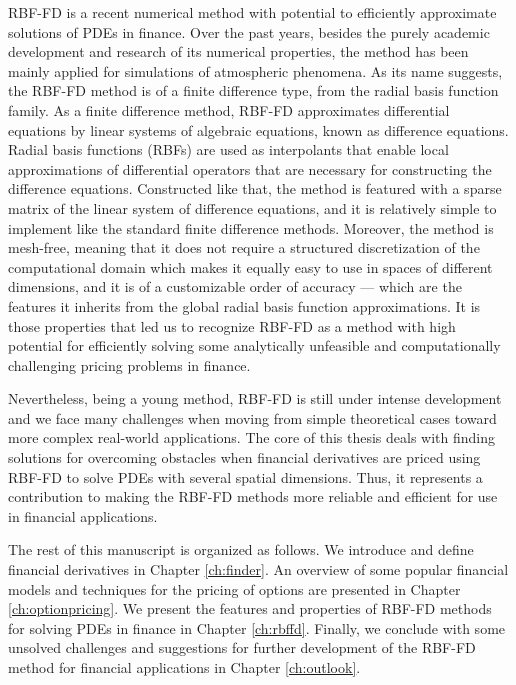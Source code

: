 \documentclass{UUThesisTemplate}
\begin{document}
\par RBF-FD is a recent numerical method with potential to efficiently approximate solutions of PDEs in finance. Over the past years, besides the purely academic development and research of its numerical properties, the method has been mainly applied for simulations of atmospheric phenomena. As its name suggests, the RBF-FD method is of a finite difference type, from the radial basis function family. As a finite difference method, RBF-FD approximates differential equations by linear systems of algebraic equations, known as difference equations. Radial basis functions (RBFs) are used as interpolants that enable local approximations of differential operators that are necessary for constructing the difference equations. Constructed like that, the method is featured with a sparse matrix of the linear system of difference equations, and it is relatively simple to implement like the standard finite difference methods. Moreover, the method is mesh-free, meaning that it does not require a structured discretization of the computational domain which makes it equally easy to use in spaces of different dimensions, and it is of a customizable order of accuracy --- which are the features it inherits from the global radial basis function approximations. It is those properties that led us to recognize RBF-FD as a method with high potential for efficiently solving some analytically unfeasible and computationally challenging pricing problems in finance.
\par Nevertheless, being a young method, RBF-FD is still under intense development and we face many challenges when moving from simple theoretical cases toward more complex real-world applications. The core of this thesis deals with finding solutions for overcoming obstacles when financial derivatives are priced using RBF-FD to solve PDEs with several spatial dimensions. Thus, it represents a contribution to making the RBF-FD methods more reliable and efficient for use in financial applications. 
\par The rest of this manuscript is organized as follows. We introduce and define financial derivatives in Chapter \ref{ch:finder}. An overview of some popular financial models and techniques for the pricing of options are presented in Chapter \ref{ch:optionpricing}. We present the features and properties of RBF-FD methods for solving PDEs in finance in Chapter \ref{ch:rbffd}. Finally, we conclude with some unsolved challenges and suggestions for further development of the RBF-FD method for financial applications in Chapter \ref{ch:outlook}.
%
%
\end{document}
